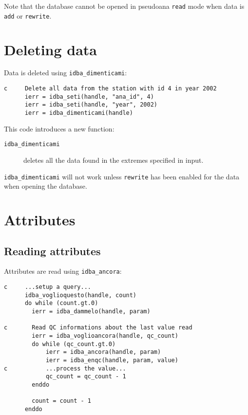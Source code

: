 \documentclass[final,12pt,a4paper,twoside]{book}
\begin{document}
Note that the database cannot be opened in pseudoana {\tt read} mode when data
is {\tt add} or {\tt rewrite}.
  
\section{Deleting data}

Data is deleted using {\tt idba\_dimenticami}:
\label{fun-idba_dimenticami}

\begin{verbatim}
c     Delete all data from the station with id 4 in year 2002
      ierr = idba_seti(handle, "ana_id", 4)
      ierr = idba_seti(handle, "year", 2002)
      ierr = idba_dimenticami(handle)
\end{verbatim}

This code introduces a new function:

\begin{description}
\item[{\tt idba\_dimenticami}]
  deletes all the data found in the extremes specified in input.
\end{description}

{\tt idba\_dimenticami} will not work unless {\tt rewrite} has been enabled for
the data when opening the database.

\section {Attributes}

\subsection{Reading attributes}

Attributes are read using {\tt idba\_ancora}:
\label{fun-idba_voglioancora}
\label{fun-idba_ancora}

\begin{verbatim}
c     ...setup a query...
      idba_voglioquesto(handle, count)
      do while (count.gt.0)
        ierr = idba_dammelo(handle, param)

c       Read QC informations about the last value read
        ierr = idba_voglioancora(handle, qc_count)
        do while (qc_count.gt.0)
            ierr = idba_ancora(handle, param) 
            ierr = idba_enqc(handle, param, value)
c           ...process the value...
            qc_count = qc_count - 1
        enddo

        count = count - 1
      enddo
\end{verbatim}
\end{document}
